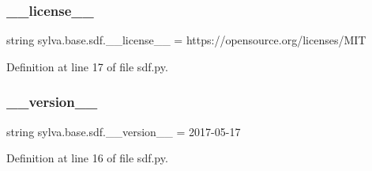 \subsubsection{\texorpdfstring{\+\_\+\+\_\+license\+\_\+\+\_\+}{\_\_license\_\_}}
{\footnotesize\ttfamily string sylva.\+base.\+sdf.\+\_\+\+\_\+license\+\_\+\+\_\+ = \textquotesingle{}https\+://opensource.\+org/licenses/M\+IT\textquotesingle{}\hspace{0.3cm}{\ttfamily [private]}}



Definition at line 17 of file sdf.\+py.

\mbox{\label{namespacesylva_1_1base_1_1sdf_adccda126d39b0e5206af68035aea9066}} 
\subsubsection{\texorpdfstring{\+\_\+\+\_\+version\+\_\+\+\_\+}{\_\_version\_\_}}
{\footnotesize\ttfamily string sylva.\+base.\+sdf.\+\_\+\+\_\+version\+\_\+\+\_\+ = \textquotesingle{}2017-\/05-\/17\textquotesingle{}\hspace{0.3cm}{\ttfamily [private]}}



Definition at line 16 of file sdf.\+py.

